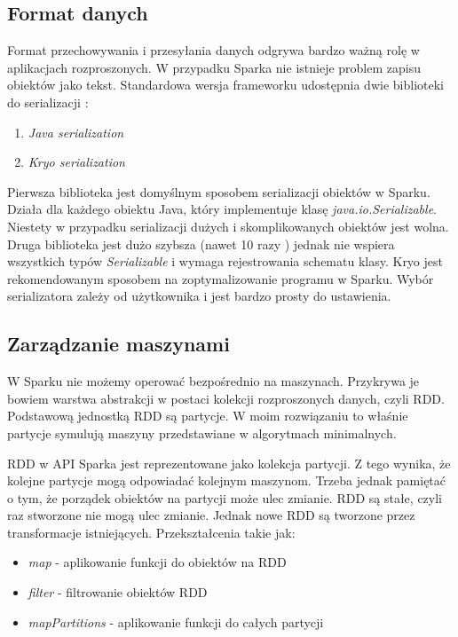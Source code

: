 \documentclass{pracamgr}
\begin{document}
\subsection{Format danych}
Format przechowywania i przesyłania danych odgrywa bardzo ważną rolę w aplikacjach rozproszonych. W przypadku Sparka nie istnieje problem zapisu obiektów jako tekst. Standardowa wersja frameworku udostępnia dwie biblioteki do serializacji \cite{karau2015learning}:
\begin{enumerate}
    \item \textit{Java serialization}
    \item \textit{Kryo serialization}
\end{enumerate}

Pierwsza biblioteka jest domyślnym sposobem serializacji obiektów w Sparku. Działa dla każdego obiektu Java, który implementuje klasę \textit{java.io.Serializable}. Niestety w przypadku serializacji dużych i skomplikowanych obiektów jest wolna. Druga biblioteka jest dużo szybsza (nawet 10 razy \cite{spark_serialization}) jednak nie wspiera wszystkich typów \textit{Serializable} i wymaga rejestrowania schematu klasy. Kryo jest rekomendowanym sposobem na zoptymalizowanie programu w Sparku. Wybór serializatora zależy od użytkownika i jest bardzo prosty do ustawienia.

\subsection{Zarządzanie maszynami}

W Sparku nie możemy operować bezpośrednio na maszynach. Przykrywa je bowiem warstwa abstrakcji w postaci kolekcji rozproszonych danych, czyli RDD. Podstawową jednostką RDD są partycje. W moim rozwiązaniu to właśnie partycje symulują maszyny przedstawiane w algorytmach minimalnych.

RDD w API Sparka jest reprezentowane jako kolekcja partycji. Z tego wynika, że kolejne partycje mogą odpowiadać kolejnym maszynom. Trzeba jednak pamiętać o tym, że porządek obiektów na partycji może ulec zmianie. RDD są stałe, czyli raz stworzone nie mogą ulec zmianie. Jednak nowe RDD są tworzone przez transformacje istniejących. Przekształcenia takie jak:
\begin{itemize}
    \item \textit{map} - aplikowanie funkcji do obiektów na RDD
    \item \textit{filter} - filtrowanie obiektów RDD
    \item \textit{mapPartitions} - aplikowanie funkcji do całych partycji
\end{itemize}
 
\end{document}
